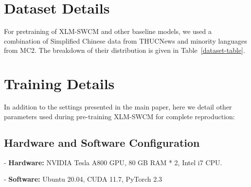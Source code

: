 \clearpage
\appendix

\section{Dataset Details}\label{sec:Dataset Detail}

For pretraining of XLM-SWCM and other baseline models, we used a combination of Simplified Chinese data from THUCNews and minority languages from MC2. The breakdown of their distribution is given in Table~\ref{dataset-table}.

\begin{table}[ht]
  \centering
 \caption{\label{dataset-table}
   Statistics of our pretraining dataset.
}
\end{table}



\section{Training Details}\label{sec:Training Detail}
In addition to the settings presented in the main paper, here we detail other parameters used during pre-training XLM-SWCM for complete reproduction:

\subsection*{Hardware and Software Configuration}
\phantom{.}\vspace{-14pt}

- \textbf{Hardware:} NVIDIA Tesla A800 GPU, 80 GB RAM * 2, Intel i7 CPU.

- \textbf{Software:} Ubuntu 20.04, CUDA 11.7, PyTorch 2.3


